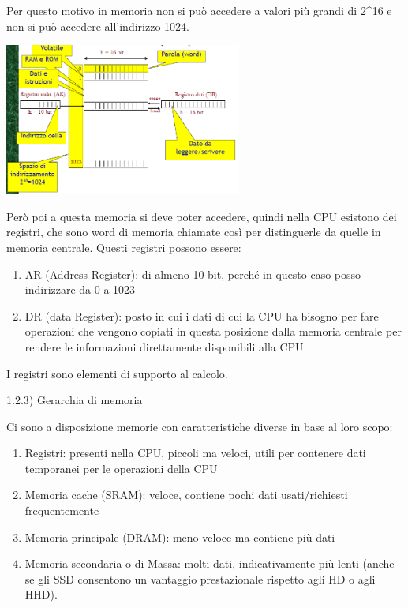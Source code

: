 \documentclass[
  paper=a4,
  oneside  ,captions=tableheading
]{scrbook}
\providecommand{\tightlist}{%
  \setlength{\itemsep}{0pt}\setlength{\parskip}{0pt}}
\begin{document}
Per questo motivo in memoria non si può accedere a valori più grandi di
2\^{}16 e non si può accedere all'indirizzo 1024.

\includegraphics[height=5cm]{./image/image-20201111185631084.png}

Però poi a questa memoria si deve poter accedere, quindi nella CPU
esistono dei registri, che sono word di memoria chiamate così per
distinguerle da quelle in memoria centrale. Questi registri possono
essere:

\begin{enumerate}
\def\labelenumi{\arabic{enumi}.}
\tightlist
\item
  AR (Address Register): di almeno 10 bit, perché in questo caso posso
  indirizzare da 0 a 1023
\item
  DR (data Register): posto in cui i dati di cui la CPU ha bisogno per
  fare operazioni che vengono copiati in questa posizione dalla memoria
  centrale per rendere le informazioni direttamente disponibili alla
  CPU.
\end{enumerate}

I registri sono elementi di supporto al calcolo.

1.2.3) Gerarchia di memoria

Ci sono a disposizione memorie con caratteristiche diverse in base al
loro scopo:

\begin{enumerate}
\def\labelenumi{\arabic{enumi}.}
\tightlist
\item
  Registri: presenti nella CPU, piccoli ma veloci, utili per contenere
  dati temporanei per le operazioni della CPU
\item
  Memoria cache (SRAM): veloce, contiene pochi dati usati/richiesti
  frequentemente
\item
  Memoria principale (DRAM): meno veloce ma contiene più dati
\item
  Memoria secondaria o di Massa: molti dati, indicativamente più lenti
  (anche se gli SSD consentono un vantaggio prestazionale rispetto agli
  HD o agli HHD).
\end{enumerate}
\end{document}
